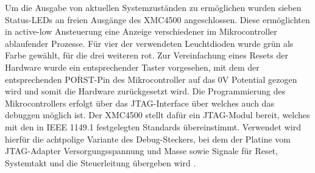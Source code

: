 
Um die Ausgabe von aktuellen Systemzuständen zu ermöglichen wurden sieben Status-LEDs an freien Ausgänge des XMC4500  angeschlossen. Diese ermöglichten in active-low Ansteuerung eine Anzeige verschiedener im Mikrocontroller ablaufender Prozesse. Für vier der verwendeten Leuchtdioden wurde grün als Farbe gewählt, für die drei weiteren rot. Zur Vereinfachung eines Resets der Hardware wurde ein entsprechender Taster vorgesehen, mit dem der entsprechenden  $\overline{\text{PORST}}$-Pin des Mikrocontroller auf das 0V Potential gezogen wird und somit die Hardware zurückgesetzt wird.
Die Programmierung des Mikrocontrollers erfolgt über das \ac{JTAG}-Interface über welches auch das debuggen möglich ist. Der XMC4500 stellt dafür ein \ac{JTAG}-Modul bereit, welches mit den in IEEE 1149.1 festgelegten Standards übereinstimmt. Verwendet wird hierfür die achtpolige Variante des Debug-Steckers, bei dem der Platine vom \ac{JTAG}-Adapter Versorgungsspannung und Masse sowie Signale für Reset, Systemtakt und die Steuerleitung übergeben wird \cite{XMC-DataSheet}.  %


